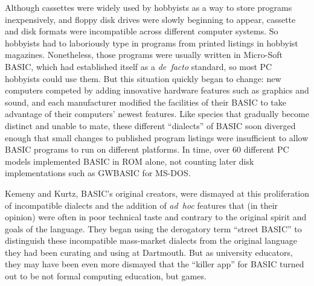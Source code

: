 Although cassettes were widely used by hobbyists as a way to store
programs inexpensively, and floppy disk drives were slowly beginning
to appear, cassette and disk formats were incompatible across
different computer systems.
So hobbyists had to laboriously type in programs from printed listings
in hobbyist magazines.
Nonetheless, those programs were usually written in Micro-Soft BASIC,
which had established itself as a \emph{de~facto} standard, so most PC
hobbyists could use them.
But this situation quickly began to change: new computers competed by
adding innovative hardware features such as
graphics and sound, and each manufacturer modified the facilities of
their BASIC to take advantage of their computers' newest features.
Like species that gradually become distinct and unable to mate, these
different ``dialects'' of BASIC soon diverged enough that small
changes to published program listings were insufficient to allow BASIC
programs to run on different platforms.
In time, over 60 different PC models implemented BASIC in ROM alone,
not counting later disk implementations such as GWBASIC for MS-DOS.


Kemeny and Kurtz, BASIC's original creators, were dismayed at this
proliferation of incompatible dialects and the addition of
\emph{ad~hoc} features that (in their opinion) were often in poor
technical taste and contrary to the original spirit and goals of the
language.
They began using the derogatory term ``street BASIC'' to distinguish
these incompatible mass-market dialects from the original language
they had been curating and using at Dartmouth.
But as university educators, they may have been even more dismayed
that the ``killer app'' for BASIC turned out to be not formal
computing education, but games.


